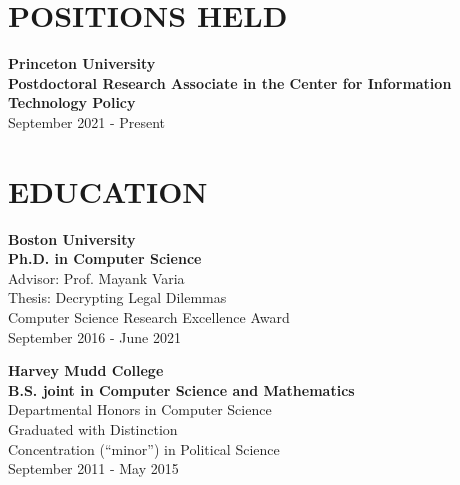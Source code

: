 \documentclass{res}
\begin{document}
 



\address{\texttt{sscheff@princeton.edu}\\\texttt{https://sarahscheffler.net}\\\texttt{https://github.com/sarahscheffler}}
\address{~~~~~~~~~~18 Vandeventer Ave \#1\\~~~~~~~~~~~~~~Princeton, NJ 08542\\~~~~~~~~~~~~~~~~~~~~\hspace{-0.049cm}(720) 234 - 6853}
                                  
\begin{resume}


    \vspace{0.1in}
\section{POSITIONS HELD}  
\vspace{0.1in}

\textbf{Princeton University} \\
\textbf{Postdoctoral Research Associate in the Center for Information Technology Policy} \\
    September 2021 - Present

    \vspace{0.1in}
\section{EDUCATION}  
\vspace{0.1in}

    \textbf{Boston University} \\
    \textbf{Ph.D. in Computer Science} \\
    Advisor: Prof. Mayank Varia \\
    Thesis: Decrypting Legal Dilemmas \\
    Computer Science Research Excellence Award \\
    September 2016 - June 2021

    \textbf{Harvey Mudd College} \\
    \textbf{B.S. joint in Computer Science and Mathematics}  \\
    Departmental Honors in Computer Science \\
    Graduated with Distinction \\
    Concentration (``minor'') in Political Science \\
    September 2011 - May 2015


\end{resume}
\end{document}
